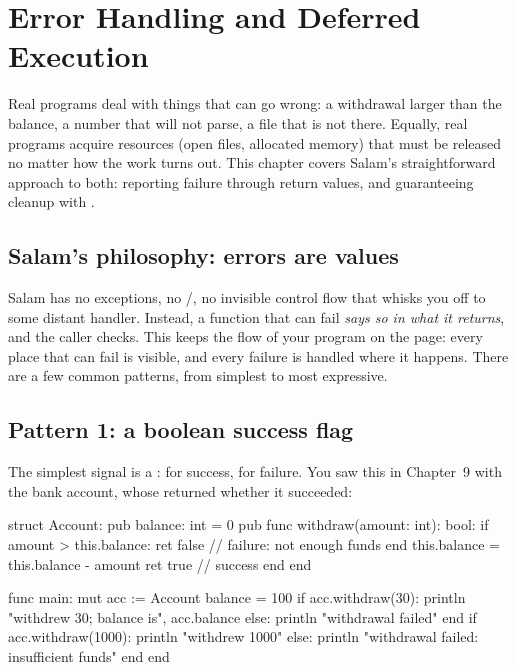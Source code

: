 \chapter{Error Handling and Deferred Execution}%
\label{ch:error-defer}

Real programs deal with things that can go wrong: a withdrawal larger than the
balance, a number that will not parse, a file that is not there. Equally, real
programs acquire resources (open files, allocated memory) that must be
released no matter how the work turns out. This chapter covers Salam's
straightforward approach to both: reporting failure through return values, and
guaranteeing cleanup with .

\section{Salam's philosophy: errors are values}

Salam has no exceptions, no /, no invisible control flow
that whisks you off to some distant handler. Instead, a function that can fail
\emph{says so in what it returns}, and the caller checks. This keeps the flow of
your program on the page: every place that can fail is visible, and every failure
is handled where it happens. There are a few common patterns, from simplest to
most expressive.

\section{Pattern 1: a boolean success flag}

The simplest signal is a :  for success,  for
failure. You saw this in Chapter~9 with the bank account, whose 
returned whether it succeeded:

\begin{salamen}
struct Account:
    pub balance: int = 0
    pub func withdraw(amount: int): bool:
        if amount > this.balance:
            ret false              // failure: not enough funds
        end
        this.balance = this.balance - amount
        ret true                   // success
    end
end

func main:
    mut acc := Account { balance = 100 }
    if acc.withdraw(30):
        println "withdrew 30; balance is", acc.balance
    else:
        println "withdrawal failed"
    end
    if acc.withdraw(1000):
        println "withdrew 1000"
    else:
        println "withdrawal failed: insufficient funds"
    end
end
\end{salamen}

